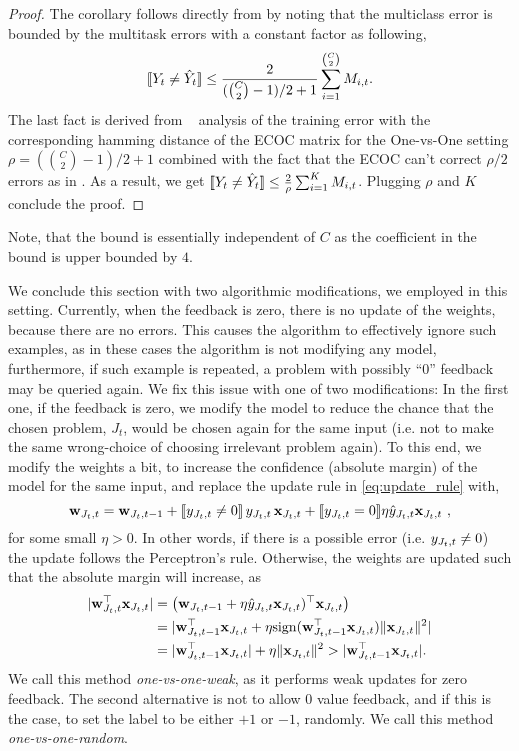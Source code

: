 \begin{proof}
The corollary follows directly from  by noting that the  multiclass error 
is bounded by the multitask errors with a constant factor as following, 
\[
[\![{Y_t \neq \hat{Y}_t}]\!] \leq \frac{2}{({C \choose 2}-1)/2+1}\sum_{i=1}^{ {C \choose 2}} M_{i,t}. 
\]
The last fact is derived from ~\cite{allwein2001reducing} analysis of the training error 
with the corresponding hamming distance of the ECOC matrix for the One-vs-One 
setting $\rho = ({C \choose 2}-1)/2+1$ combined with the fact that the ECOC can't correct $\rho/2$ errors as in 
\cite{dietterich1995solving}. As a result, we get  $[\![{Y_t \neq \hat{Y}_t}]\!] \leq \frac{2}{\rho} 
\sum_{i=1}^KM_{i,t}$.
Plugging $\rho$ and $K$ conclude the proof.
\QED
\end{proof}

Note, that the bound is essentially  independent of $C$ as the coefficient in the bound is upper 
bounded by $4$.

We conclude this section with two algorithmic modifications, we employed in this setting. 
Currently, when the feedback is zero, there is no update of the weights, because there are no errors.
 This causes the algorithm to effectively ignore such examples, as in these cases the algorithm is not 
 modifying any model, furthermore, if such example is repeated, a problem with possibly ``0'' feedback 
 may be queried again.
We fix this issue with one of two modifications: In the first one, if the feedback is zero, we modify the model 
to reduce the chance that the chosen problem, $J_t$, would be chosen again for the same input 
(i.e. not to make the same wrong-choice of choosing irrelevant problem again). To this end, we modify the 
weights a bit, to increase the confidence (absolute margin) of the model for the same input, and replace the 
update rule in \eqref{eq:update_rule} with,
\[
\mathbf{w}_{J_t,t} = \mathbf{w}_{J_t,t-1}+ [\![{y_{J_t,t}\ne0}]\!] \, y_{J_t,t}\, \mathbf{x}_{J_t,t} +
 [\![{y_{J_t,t}=0}]\!] \eta \hat{y}_{J_t,t}\mathbf{x}_{J_t,t}~,
\]
for some small $\eta>0$. In other words, if there is a possible error (i.e. $y_{J_t,t}\ne0$) the update follows the 
Perceptron's rule. Otherwise, the weights are updated such that the absolute margin will increase, 
as 
\[
\begin{split}
\vert {\mathbf{w}}^{\top}_{J_t,t} \mathbf{x}_{J_t,t} \vert &= \left({\mathbf{w}_{J_t,t-1}+ \eta \hat{y}_{J_t,t}\mathbf{x}_{J_t,t})^{\top}\mathbf{x}_{J_t,t}}\right)\\ 
&= \vert {\mathbf{w}}^{\top}_{J_t,t-1}\mathbf{x}_{J_t,t}+ \eta {\rm sign}({\mathbf{w}}^{\top}_{J_t,t-1}\mathbf{x}_{J_t,t}) \Vert\mathbf{x}_{J_t,t}\Vert^2 \vert\\
&=\vert {\mathbf{w}}^{\top}_{J_t,t-1}\mathbf{x}_{J_t,t}\vert + \eta \Vert\mathbf{x}_{J_t,t}\Vert^2 >\vert {\mathbf{w}}^{\top}_{J_t,t-1}\mathbf{x}_{J_t,t}\vert. 
\end{split}
\]
We call this method {\em one-vs-one-weak}, as it performs weak updates for zero feedback. 
The second alternative is not to allow $0$ value feedback, and if this is the case, to set the label to be 
either $+1$ or $-1$, randomly.
We call this method {\em one-vs-one-random}.
